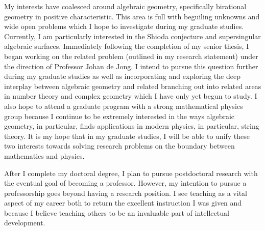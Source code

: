 \documentclass[11pt]{amsart}
\begin{document}
My interests have coalesced around algebraic geometry, specifically birational geometry in positive characteristic. This area is full with beguiling unknowns and wide open problems which I hope to investigate during my graduate studies. Currently, I am particularly interested in the Shioda conjecture and supersingular algebraic surfaces. Immediately following the completion of my senior thesis, I began working on the related problem (outlined in my research statement) under the direction of Professor Johan de Jong. I intend to pursue this question further during my graduate studies as well as incorporating and exploring the deep interplay between algebraic geometry and related branching out into related areas in number theory and complex geometry which I have only yet begun to study. I also hope to attend a graduate program with a strong mathematical physics group because I continue to be extremely interested in the ways algebraic geometry, in particular, finds applications in modern physics, in particular, string theory. It is my hope that in my graduate studies, I will be able to unify these two interests towards solving research problems on the boundary between mathematics and physics.
\par
After I complete my doctoral degree, I plan to pursue postdoctoral research with the eventual goal of becoming a professor. However, my intention to pursue a professorship goes beyond having a research position. I see teaching as a vital aspect of my career both to return the excellent instruction I was given and because I believe teaching others to be an invaluable part of intellectual development.




\end{document}
